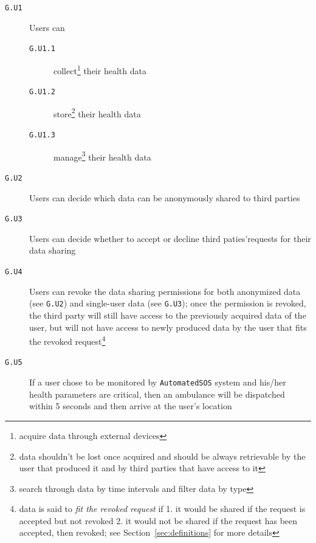 \documentclass[12pt]{article}
\begin{document}

        \begin{description}


          \item[\texttt{G.U1}] Users can
          \begin{description}
            \item[\texttt{G.U1.1}] collect\footnote{acquire data through external devices} their health data
            \item[\texttt{G.U1.2}] store\footnote{data shouldn't be lost once acquired and should be always retrievable by the user that produced it and by third parties that have access to it} their health data
            \item[\texttt{G.U1.3}] manage\footnote{search through data by time intervals and filter data by type} their health data
          \end{description}
          \item[\texttt{G.U2}] Users can decide which data can be anonymously shared to third parties
          \item[\texttt{G.U3}] Users can decide whether to accept or decline third paties'requests for their data sharing
          \item[\texttt{G.U4}] Users can revoke the data sharing permissions for both anonymized data (see \texttt{G.U2}) and single-user data (see \texttt{G.U3}); once the permission is revoked, the third party will still have access to the previously acquired data of the user, but will not have access to newly produced data by the user that fits the revoked request\footnote{
          data is said to \textit{fit the revoked request} if
          1. it would be shared if the request is accepted but not revoked
          2. it would not be shared if the request has been accepted, then revoked; see Section~\ref{sec:definitions} for more details}
          \item[\texttt{G.U5}] If a user chose to be monitored by \texttt{AutomatedSOS} system and his/her health parameters are critical, then an ambulance will be dispatched within 5 seconds and then arrive at the user's location



\end{description}
\end{document}
